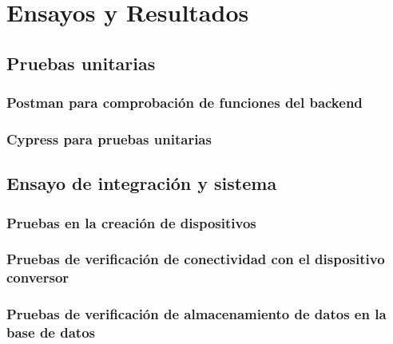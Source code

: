 
\chapter{Ensayos y Resultados} %

\label{Chapter4} %


\section{Pruebas unitarias}
\label{sec:pruebasHW}


\subsection{Postman para comprobación de funciones del backend}
\subsection{Cypress para pruebas unitarias}

\section{Ensayo de integración y sistema}

\subsection{Pruebas en la creación de dispositivos}
\subsection{Pruebas de verificación de conectividad con el dispositivo conversor}
\subsection{Pruebas de verificación de almacenamiento de datos en la base de datos}